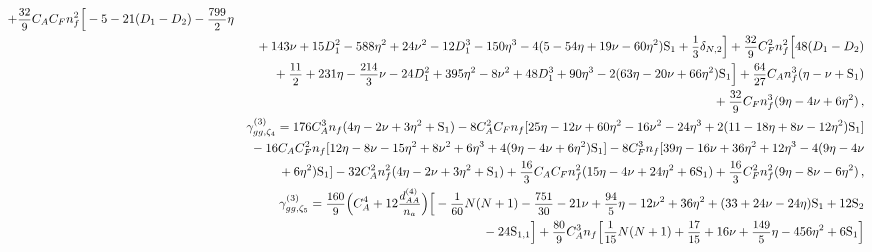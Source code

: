 \documentclass[
 twocolumn,
 superscriptaddress,
 preprintnumbers,
 nofootinbib,
 amsmath,amssymb,
 aps,
 prl
 ]{revtex4-2}
\newcommand\HS{\mathrm{S}}
\def\D#1{D_#1}
\def\frct#1#2{\mbox{\small{$\displaystyle\frac{#1}{#2}$}}}
\begin{document}
\begin{widetext}
\begin{eqnarray}
+\frct{32}{9}\*C_A\*C_F\*n_f^2\*\Big[
-5
-21\*(\D1-\D2)
-\frct{799}{2}\*\eta
\nonumber\\
&&{}
+143\*\nu
+15\*\D1^2
-588\*\eta^2
+24\*\nu^2
-12\*\D1^3
-150\*\eta^3
-4\*
(
5
-54\*\eta
+19\*\nu
-60\*\eta^2
)\*\HS_{1}
+\frct{1}{3}\*\delta_{N,2}
\Big]

+\frct{32}{9}\*C_F^2\*n_f^2\*\Big[
48\*(\D1-\D2)
\nonumber\\
&&{}
+\frct{11}{2}
+231\*\eta
-\frct{214}{3}\*\nu
-24\*\D1^2
+395\*\eta^2
-8\*\nu^2
+48\*\D1^3
+90\*\eta^3
-2\*
(63\*\eta
-20\*\nu
+66\*\eta^2
)\*\HS_{1}
\Big]

+
\frct{64}{27}\*C_A\*n_f^3\*
(\eta
-\nu
+\HS_{1})

\nonumber\\
&&{}
+\frct{32}{9}\*C_F\*n_f^3\*
(9\*\eta
-4\*\nu
+6\*\eta^2)


\,,
\\



&&\gamma_{gg,\zeta_4}^{(3)}=






176\*C_A^3\*n_f\*
(4\*\eta
-2\*\nu
+3\*\eta^2
+\HS_{1})

-8\*C_A^2\*C_F\*n_f\*
[25\*\eta
-12\*\nu
+60\*\eta^2
-16\*\nu^2
-24\*\eta^3
+2\*
(11
-18\*\eta
+8\*\nu
-12\*\eta^2
)\*\HS_{1}]
\nonumber\\
&&{}

-16\*C_A\*C_F^2\*n_f\*
[12\*\eta
-8\*\nu
-15\*\eta^2
+8\*\nu^2
+6\*\eta^3
+4\*
(9\*\eta
-4\*\nu
+6\*\eta^2
)\*\HS_{1}]

-8\*C_F^3\*n_f\*
[39\*\eta
-16\*\nu
+36\*\eta^2
+12\*\eta^3
-4\*
(9\*\eta
-4\*\nu
\nonumber\\
&&{}
+6\*\eta^2
)\*\HS_{1}]

-32\*C_A^2\*n_f^2\*
(4\*\eta
-2\*\nu
+3\*\eta^2
+\HS_{1})

+\frct{16}{3}\*C_A\*C_F\*n_f^2\*
(15\*\eta
-4\*\nu
+24\*\eta^2
+6\*\HS_{1})

+\frct{16}{3}\*C_F^2\*n_f^2\*
(9\*\eta
-8\*\nu
-6\*\eta^2
   )


\,,
\\




&&\gamma_{gg,\zeta_5}^{(3)}=






\frct{160}{9}\*\Big(C_A^4+12\*\frct{d_{AA}^{(4)}}{n_a}\Big)\*
\Big[
-\frct{1}{60}\*N\*(N+1)
-\frct{751}{30}
-21\*\nu
+\frct{94}{5}\*\eta
-12\*\nu^2
+36\*\eta^2
+(33
+24\*\nu
-24\*\eta)\*\HS_{1}
+12\*\HS_{2}
\nonumber\\ &&{}
-24\*\HS_{1,1}
\Big]
+\frct{80}{9}\*C_A^3\*n_f\*
\Big[
\frct{1}{15}\*N\*(N+1)
+\frct{17}{15}
+16\*\nu
+\frct{149}{5}\*\eta
-456\*\eta^2
+6\*\HS_{1}
\Big]


\end{eqnarray}
\end{widetext}
\end{document}
